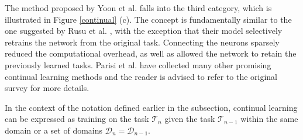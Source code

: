 The method proposed by Yoon et al. \cite{Yoon2017} falls into the third category, which is illustrated in Figure \ref{continual} (c). The concept is fundamentally similar to the one suggested by Rusu et al. \cite{Rusu2016}, with the exception that their model selectively retrains the network from the original task. Connecting the neurons sparsely reduced the computational overhead, as well as allowed the network to retain the previously learned tasks. Parisi et al. \cite{Parisi2018} have collected many other promising continual learning methods and the reader is advised to refer to the original survey for more details.   

In the context of the notation defined earlier in the  subsection, continual learning can be expressed as training on the task $\mathcal{T}_n$ given the task $\mathcal{T}_{n-1}$ within the same domain or a set of domains $\mathcal{D}_{n} = \mathcal{D}_{n-1}$.   



\clearpage 